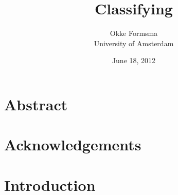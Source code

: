 \documentclass[a4paper, 10pt]{report}
\title{Classifying}
\date{June 18, 2012}
\author{Okke Formsma\\ University of Amsterdam}
\begin{document}
\maketitle


\chapter*{Abstract}


\chapter*{Acknowledgements}


\tableofcontents
{}

\chapter{Introduction}
\label{chapter:introduction}

\end{document}
